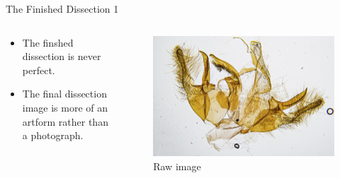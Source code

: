 \documentclass[
  ignorenonframetext,
]{beamer}
\providecommand{\tightlist}{%
  \setlength{\itemsep}{0pt}\setlength{\parskip}{0pt}}
\begin{document}
\begin{frame}{The Finished Dissection 1}
\protect\hypertarget{the-finished-dissection-1}{}
\begin{columns}[T]
\begin{column}{0.5\textwidth}
\begin{itemize}
\tightlist
\item
  The finshed dissection is never perfect.
\item
  The final dissection image is more of an artform rather than a
  photograph.
\end{itemize}
\end{column}

\begin{column}{0.5\textwidth}
\begin{figure}
\centering
\includegraphics{./images/PJP20220218-001-raw-dissection.jpg}
\caption{Raw image}
\end{figure}
\end{column}
\end{columns}
\end{frame}
\end{document}
